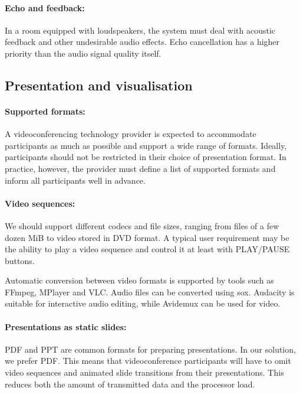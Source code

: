 \paragraph*{Echo and feedback:}
In a room equipped with loudspeakers, the system must deal with acoustic feedback and other undesirable audio effects. Echo cancellation has a higher priority than the audio signal quality itself.

\subsection{Presentation and visualisation}

\paragraph*{Supported formats:}
A videoconferencing technology provider is expected to accommodate participants as much as possible and support a wide range of formats. Ideally, participants should not be restricted in their choice of presentation format. In practice, however, the provider must define a list of supported formats and inform all participants well in advance.

\paragraph*{Video sequences:}
We should support different codecs and file sizes, ranging from files of a few dozen MiB to video stored in DVD format. A typical user requirement may be the ability to play a video sequence and control it at least with PLAY/PAUSE buttons.

Automatic conversion between video formats is supported by tools such as FFmpeg, MPlayer and VLC. Audio files can be converted using sox. Audacity is suitable for interactive audio editing, while Avidemux can be used for video.

\paragraph*{Presentations as static slides:}
PDF and PPT are common formats for preparing presentations. In our solution, we prefer PDF. This means that videoconference participants will have to omit video sequences and animated slide transitions from their presentations. This reduces both the amount of transmitted data and the processor load.

